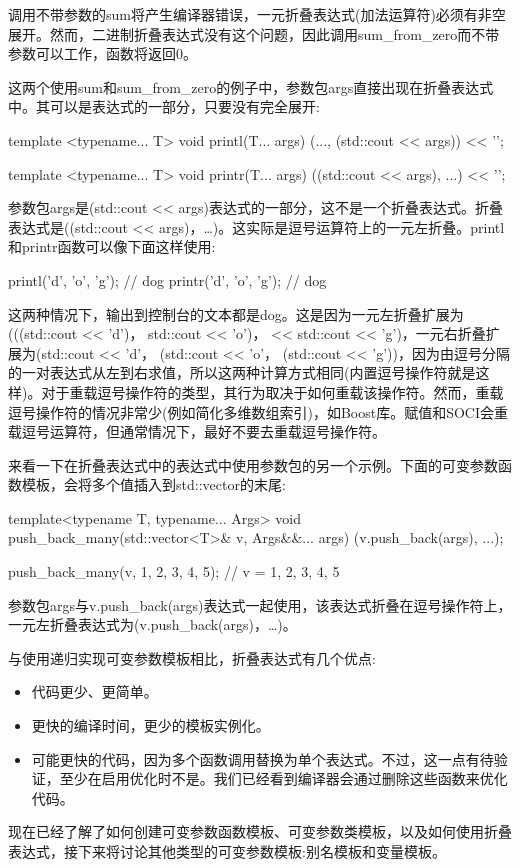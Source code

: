 调用不带参数的sum将产生编译器错误，一元折叠表达式(加法运算符)必须有非空展开。然而，二进制折叠表达式没有这个问题，因此调用sum\_from\_zero而不带参数可以工作，函数将返回0。

这两个使用sum和sum\_from\_zero的例子中，参数包args直接出现在折叠表达式中。其可以是表达式的一部分，只要没有完全展开:

\begin{cpp}
template <typename... T>
void printl(T... args)
{
	(..., (std::cout << args)) << '\n';
}

template <typename... T>
void printr(T... args)
{
	((std::cout << args), ...) << '\n';
}
\end{cpp}

参数包args是(std::cout <{}< args)表达式的一部分，这不是一个折叠表达式。折叠表达式是((std::cout <{}< args)，…)。这实际是逗号运算符上的一元左折叠。printl和printr函数可以像下面这样使用:

\begin{cpp}
printl('d', 'o', 'g'); // dog
printr('d', 'o', 'g'); // dog
\end{cpp}

这两种情况下，输出到控制台的文本都是dog。这是因为一元左折叠扩展为(((std::cout <{}< 'd')， std::cout <{}< 'o')， << std::cout <{}< 'g')，一元右折叠扩展为(std::cout <{}< 'd'， (std::cout <{}< 'o'， (std::cout <{}< 'g'))，因为由逗号分隔的一对表达式从左到右求值，所以这两种计算方式相同(内置逗号操作符就是这样)。对于重载逗号操作符的类型，其行为取决于如何重载该操作符。然而，重载逗号操作符的情况非常少(例如简化多维数组索引)，如Boost库。赋值和SOCI会重载逗号运算符，但通常情况下，最好不要去重载逗号操作符。

来看一下在折叠表达式中的表达式中使用参数包的另一个示例。下面的可变参数函数模板，会将多个值插入到std::vector的末尾:

\begin{cpp}
template<typename T, typename... Args>
void push_back_many(std::vector<T>& v, Args&&... args)
{
	(v.push_back(args), ...);
}

push_back_many(v, 1, 2, 3, 4, 5); // v = {1, 2, 3, 4, 5}
\end{cpp}

参数包args与v.push\_back(args)表达式一起使用，该表达式折叠在逗号操作符上，一元左折叠表达式为(v.push\_back(args)，…)。

与使用递归实现可变参数模板相比，折叠表达式有几个优点:

\begin{itemize}
\item
代码更少、更简单。

\item
更快的编译时间，更少的模板实例化。

\item
可能更快的代码，因为多个函数调用替换为单个表达式。不过，这一点有待验证，至少在启用优化时不是。我们已经看到编译器会通过删除这些函数来优化代码。
\end{itemize}

现在已经了解了如何创建可变参数函数模板、可变参数类模板，以及如何使用折叠表达式，接下来将讨论其他类型的可变参数模板:别名模板和变量模板。




















